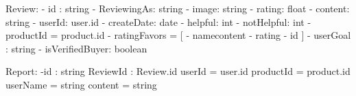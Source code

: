 Review:
    - id : string
    - ReviewingAs: string
    - image: string
    - rating: float
    - content: string
    - userId: user.id
    - createDate: date
    - helpful: int
    - notHelpful: int
    - productId = product.id 
    - ratingFavors = [{
        - namecontent
        - rating
        - id
    }]
    - userGoal : string
    - isVerifiedBuyer: boolean

Report:
    -id : string
    ReviewId : Review.id
    userId = user.id
    productId = product.id
    userName = string
    content = string
